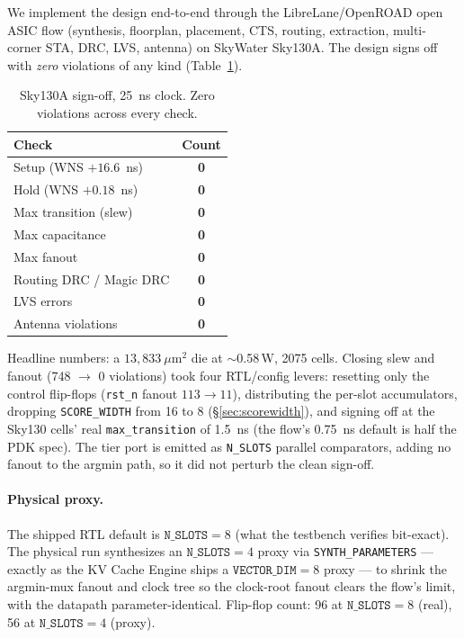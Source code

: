 \documentclass[10pt,twocolumn]{article}
\begin{document}
We implement the design end-to-end through the LibreLane/OpenROAD
\citep{librelane2024} open ASIC flow (synthesis, floorplan, placement, CTS,
routing, extraction, multi-corner STA, DRC, LVS, antenna) on SkyWater Sky130A. The
design signs off with \emph{zero} violations of any kind
(Table~\ref{tab:sky130}).

\begin{table}[tbp]
\centering
\caption{Sky130A sign-off, 25~ns clock. Zero violations across every check.}
\label{tab:sky130}
\small
\begin{tabular}{lc}
\toprule
Check & Count \\
\midrule
Setup (WNS $+16.6$~ns) & \textbf{0} \\
Hold (WNS $+0.18$~ns)  & \textbf{0} \\
Max transition (slew)  & \textbf{0} \\
Max capacitance        & \textbf{0} \\
Max fanout             & \textbf{0} \\
Routing DRC / Magic DRC & \textbf{0} \\
LVS errors             & \textbf{0} \\
Antenna violations     & \textbf{0} \\
\bottomrule
\end{tabular}
\end{table}

Headline numbers: a $13{,}833~\mu$m$^2$ die at $\sim$0.58\,\textmu W, 2075 cells.
Closing slew and fanout (748 $\to$ 0 violations) took four RTL/config levers:
resetting only the control flip-flops (\texttt{rst\_n} fanout $113\to11$),
distributing the per-slot accumulators, dropping \texttt{SCORE\_WIDTH} from 16 to 8
(\S\ref{sec:scorewidth}), and signing off at the Sky130 cells' real
\texttt{max\_transition} of 1.5~ns (the flow's 0.75~ns default is half the PDK
spec). The tier port is emitted as \texttt{N\_SLOTS} parallel comparators, adding
no fanout to the argmin path, so it did not perturb the clean sign-off.

\paragraph{Physical proxy.}
The shipped RTL default is $\texttt{N\_SLOTS}=8$ (what the testbench verifies
bit-exact). The physical run synthesizes an $\texttt{N\_SLOTS}=4$ proxy via
\texttt{SYNTH\_PARAMETERS} --- exactly as the KV Cache Engine ships a
$\texttt{VECTOR\_DIM}=8$ proxy --- to shrink the argmin-mux fanout and clock tree
so the clock-root fanout clears the flow's limit, with the datapath
parameter-identical. Flip-flop count: 96 at $\texttt{N\_SLOTS}{=}8$ (real), 56 at
$\texttt{N\_SLOTS}{=}4$ (proxy).
\end{document}
